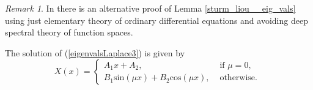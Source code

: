 \documentclass[a4paper,11pt]{article}
\theoremstyle{plain} %
\theoremstyle{definition} %
\theoremstyle{remark} %
\newtheorem{remark}{Remark}[section]
\theoremstyle{remark}
\begin{document}
\begin{remark}
In  \cite[p. 286]{walter2000ode} there is an alternative proof of Lemma \ref{sturm_liou__eig_vals} using just elementary theory of ordinary differential equations and avoiding deep spectral theory of function spaces.

\end{remark}
%
The solution of (\ref{eigenvalsLaplace3}) is given by
\begin{equation}
X(x) =
\begin{cases}
A_1 x + A_2, &\text{ if } \mu = 0, \\
B_1 \mathrm{sin}(\mu x) + B_2 \mathrm{cos}(\mu x), & \text{ otherwise. }
\end{cases}
\end{equation}
\end{document}
